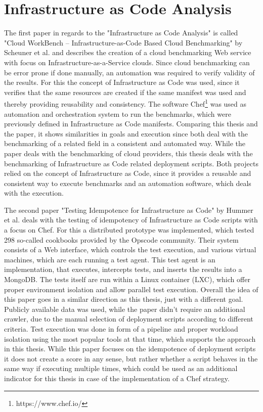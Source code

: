 \section{Infrastructure as Code Analysis}
\label{sec:iaca}
The first paper in regards to the "Infrastructure as Code Analysis" is called "Cloud WorkBench – Infrastructure-as-Code Based Cloud Benchmarking" by Scheuner et al. and describes the creation of a cloud benchmarking Web service with focus on Infrastructure-as-a-Service clouds. Since cloud benchmarking can be error prone if done manually, an automation was required to verify validity of the results. For this the concept of Infrastructure as Code was used, since it verifies that the same resources are created if the same manifest was used and thereby providing reusability and consistency. The software Chef\footnote{https://www.chef.io/} was used as automation and orchestration system to run the benchmarks, which were previously defined in Infrastructure as Code manifests. Comparing this thesis and the paper, it shows similarities in goals and execution since both deal with the benchmarking of a related field in a consistent and automated way. While the paper deals with the benchmarking of cloud providers, this thesis deals with the benchmarking of Infrastructure as Code related deployment scripts. Both projects relied on the concept of Infrastructure as Code, since it provides a reusable and consistent way to execute benchmarks and an automation software, which deals with the execution.

The second paper "Testing Idempotence for Infrastructure as Code" by Hummer et al. deals with the testing of idempotency of Infrastructure as Code scripts with a focus on Chef. For this a distributed prototype was implemented, which tested 298 so-called cookbooks provided by the Opscode community. Their system consists of a Web interface, which controls the test execution, and various virtual machines, which are each running a test agent. This test agent is an implementation, that executes, intercepts tests, and inserts the results into a MongoDB. The tests itself are run within a Linux container (LXC), which offer proper environment isolation and allow parallel test execution. Overall the idea of this paper goes in a similar direction as this thesis, just with a different goal. Publicly available data was used, while the paper didn't require an additional crawler, due to the manual selection of deployment scripts according to different criteria. Test execution was done in form of a pipeline and proper workload isolation using the most popular tools at that time, which supports the approach in this thesis. While this paper focuses on the idempotence of deployment scripts it does not create a score in any sense, but rather whether a script behaves in the same way if executing multiple times, which could be used as an additional indicator for this thesis in case of the implementation of a Chef strategy.

